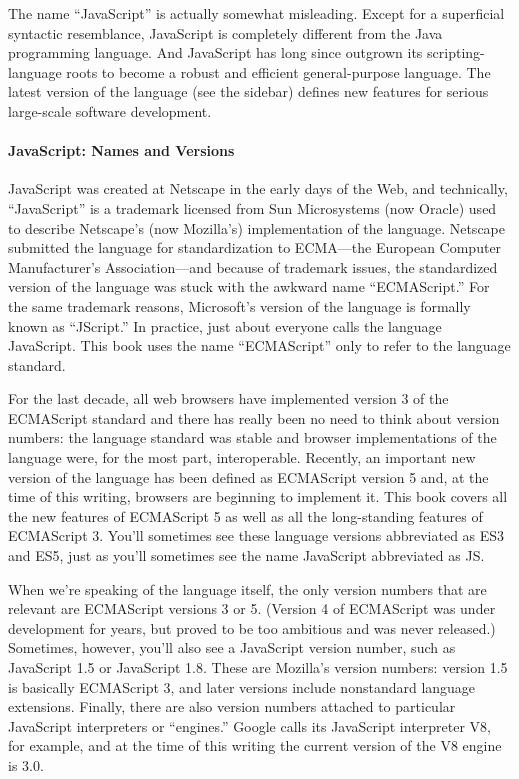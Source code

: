 The name “JavaScript” is actually somewhat misleading. Except for a superficial syntactic
resemblance, JavaScript is completely different from the Java programming language.
And JavaScript has long since outgrown its scripting-language roots to become
a robust and efficient general-purpose language. The latest version of the language (see
the sidebar) defines new features for serious large-scale software development.\cite{20}

\paragraph*{JavaScript: Names and Versions}
\hfill \break
JavaScript was created at Netscape in the early days of the Web, and technically, “JavaScript”
is a trademark licensed from Sun Microsystems (now Oracle) used to describe
Netscape’s (now Mozilla’s) implementation of the language. Netscape submitted the
language for standardization to ECMA—the European Computer Manufacturer’s Association—and
because of trademark issues, the standardized version of the language
was stuck with the awkward name “ECMAScript.” For the same trademark reasons,
Microsoft’s version of the language is formally known as “JScript.” In practice, just
about everyone calls the language JavaScript. This book uses the name “ECMAScript”
only to refer to the language standard.\cite{20}


For the last decade, all web browsers have implemented version 3 of the ECMAScript
standard and there has really been no need to think about version numbers: the language
standard was stable and browser implementations of the language were, for the
most part, interoperable. Recently, an important new version of the language has been
defined as ECMAScript version 5 and, at the time of this writing, browsers are beginning
to implement it. This book covers all the new features of ECMAScript 5 as well as all
the long-standing features of ECMAScript 3. You’ll sometimes see these language versions
abbreviated as ES3 and ES5, just as you’ll sometimes see the name JavaScript
abbreviated as JS.\cite{20}


When we’re speaking of the language itself, the only version numbers that are relevant
are ECMAScript versions 3 or 5. (Version 4 of ECMAScript was under development
for years, but proved to be too ambitious and was never released.) Sometimes, however,
you’ll also see a JavaScript version number, such as JavaScript 1.5 or JavaScript 1.8.
These are Mozilla’s version numbers: version 1.5 is basically ECMAScript 3, and later
versions include nonstandard language extensions. Finally, there are
also version numbers attached to particular JavaScript interpreters or “engines.” Google
calls its JavaScript interpreter V8, for example, and at the time of this writing the
current version of the V8 engine is 3.0.\cite{20}


